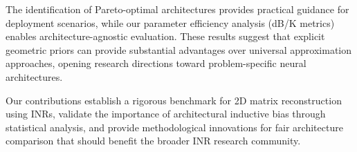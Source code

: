\documentclass{article}
\begin{document}
The identification of Pareto-optimal architectures provides practical guidance for deployment scenarios, while our parameter efficiency analysis (dB/K metrics) enables architecture-agnostic evaluation. These results suggest that explicit geometric priors can provide substantial advantages over universal approximation approaches, opening research directions toward problem-specific neural architectures.

Our contributions establish a rigorous benchmark for 2D matrix reconstruction using INRs, validate the importance of architectural inductive bias through statistical analysis, and provide methodological innovations for fair architecture comparison that should benefit the broader INR research community.



\end{document}
